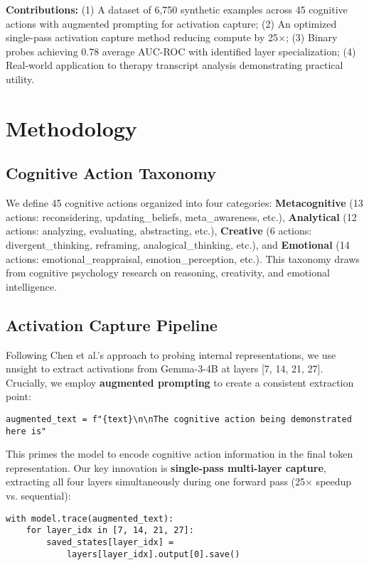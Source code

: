 \documentclass[letterpaper]{article}
\begin{document}
\textbf{Contributions:} (1) A dataset of 6,750 synthetic examples across 45 cognitive actions with augmented prompting for activation capture; (2) An optimized single-pass activation capture method reducing compute by 25$\times$; (3) Binary probes achieving 0.78 average AUC-ROC with identified layer specialization; (4) Real-world application to therapy transcript analysis demonstrating practical utility.

\section{Methodology}

\subsection{Cognitive Action Taxonomy}

We define 45 cognitive actions organized into four categories: \textbf{Metacognitive} (13 actions: reconsidering, updating\_beliefs, meta\_awareness, etc.), \textbf{Analytical} (12 actions: analyzing, evaluating, abstracting, etc.), \textbf{Creative} (6 actions: divergent\_thinking, reframing, analogical\_thinking, etc.), and \textbf{Emotional} (14 actions: emotional\_reappraisal, emotion\_perception, etc.). This taxonomy draws from cognitive psychology research on reasoning, creativity, and emotional intelligence.

\subsection{Activation Capture Pipeline}

Following Chen et al.'s \cite{chen2024designing} approach to probing internal representations, we use nnsight \cite{chen2024designing} to extract activations from Gemma-3-4B at layers [7, 14, 21, 27]. Crucially, we employ \textbf{augmented prompting} to create a consistent extraction point:

\texttt{augmented\_text = f"\{text\}\textbackslash n\textbackslash nThe cognitive action being demonstrated here is"}

This primes the model to encode cognitive action information in the final token representation. Our key innovation is \textbf{single-pass multi-layer capture}, extracting all four layers simultaneously during one forward pass (25$\times$ speedup vs. sequential):

\begin{small}
\begin{verbatim}
with model.trace(augmented_text):
    for layer_idx in [7, 14, 21, 27]:
        saved_states[layer_idx] =
            layers[layer_idx].output[0].save()
\end{verbatim}
\end{small}
\end{document}
